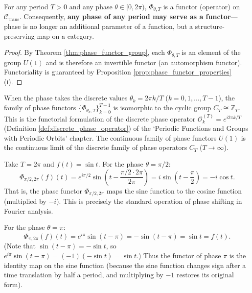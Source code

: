\begin{corollary}\label{cor:all_phases_functorial}
For any period $T > 0$ and any phase $\theta \in [0, 2\pi)$, $\Phi_{\theta, T}$ is a functor (operator) on $\mathcal{C}_{\text{trans}}$. Consequently, \textbf{any phase of any period may serve as a functor}---phase is no longer an additional parameter of a function, but a structure-preserving map on a category.
\end{corollary}

\begin{proof}
By Theorem \ref{thm:phase_functor_group}, each $\Phi_{\theta, T}$ is an element of the group $U(1)$ and is therefore an invertible functor (an automorphism functor). Functoriality is guaranteed by Proposition \ref{prop:phase_functor_properties} (i).
\end{proof}

\begin{remark}\label{rem:phase_functor_discrete}
When the phase takes the discrete values $\theta_k = 2\pi k/T$ ($k = 0, 1, \dots, T-1$), the family of phase functors $\{\Phi_{\theta_k, T}\}_{k=0}^{T-1}$ is isomorphic to the cyclic group $C_T \cong \mathbb{Z}_T$. This is the functorial formulation of the discrete phase operator $\mathcal{O}_k^{(T)} = e^{i 2\pi k / T}$ (Definition \ref{def:discrete_phase_operator}) of the `Periodic Functions and Groups with Periodic Orbits' chapter. The continuous family of phase functors $U(1)$ is the continuous limit of the discrete family of phase operators $C_T$ ($T \to \infty$).
\end{remark}

\begin{example}\label{ex:phase_functor_action}
Take $T = 2\pi$ and $f(t) = \sin t$. For the phase $\theta = \pi/2$:
\[
\Phi_{\pi/2, 2\pi}(f)(t) = e^{i\pi/2} \sin\!\left( t - \frac{\pi/2 \cdot 2\pi}{2\pi} \right) = i \sin\!\left( t - \frac{\pi}{2} \right) = -i \cos t.
\]
That is, the phase functor $\Phi_{\pi/2, 2\pi}$ maps the sine function to the cosine function (multiplied by $-i$). This is precisely the standard operation of phase shifting in Fourier analysis.

For the phase $\theta = \pi$:
\[
\Phi_{\pi, 2\pi}(f)(t) = e^{i\pi} \sin(t - \pi) = -\sin(t - \pi) = \sin t = f(t).
\]
(Note that $\sin(t - \pi) = -\sin t$, so $e^{i\pi}\sin(t-\pi) = (-1)(-\sin t) = \sin t$.) Thus the functor of phase $\pi$ is the identity map on the sine function (because the sine function changes sign after a time translation by half a period, and multiplying by $-1$ restores its original form).
\end{example}

